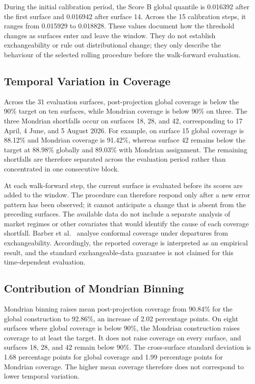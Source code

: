 During the initial calibration period, the Score B global quantile is 0.016392 after the first surface and 0.016942 after surface 14. Across the 15 calibration steps, it ranges from 0.015929 to 0.018828. These values document how the threshold changes as surfaces enter and leave the window. They do not establish exchangeability or rule out distributional change; they only describe the behaviour of the selected rolling procedure before the walk-forward evaluation.

\subsection{Temporal Variation in Coverage}
\label{subsec:disc_regime}

Across the 31 evaluation surfaces, post-projection global coverage is below the 90\% target on ten surfaces, while Mondrian coverage is below 90\% on three. The three Mondrian shortfalls occur on surfaces 18, 28, and 42, corresponding to 17 April, 4 June, and 5 August 2026. For example, on surface 15 global coverage is 88.12\% and Mondrian coverage is 91.42\%, whereas surface 42 remains below the target at 88.98\% globally and 89.03\% with Mondrian assignment. The remaining shortfalls are therefore separated across the evaluation period rather than concentrated in one consecutive block.

At each walk-forward step, the current surface is evaluated before its scores are added to the window. The procedure can therefore respond only after a new error pattern has been observed; it cannot anticipate a change that is absent from the preceding surfaces. The available data do not include a separate analysis of market regimes or other covariates that would identify the cause of each coverage shortfall. Barber et al.\ \cite{barber2023conformal} analyse conformal coverage under departures from exchangeability. Accordingly, the reported coverage is interpreted as an empirical result, and the standard exchangeable-data guarantee is not claimed for this time-dependent evaluation.

\subsection{Contribution of Mondrian Binning}
\label{subsec:disc_mondrian_remedy}

Mondrian binning raises mean post-projection coverage from 90.84\% for the global construction to 92.86\%, an increase of 2.02 percentage points. On eight surfaces where global coverage is below 90\%, the Mondrian construction raises coverage to at least the target. It does not raise coverage on every surface, and surfaces 18, 28, and 42 remain below 90\%. The cross-surface standard deviation is 1.68 percentage points for global coverage and 1.99 percentage points for Mondrian coverage. The higher mean coverage therefore does not correspond to lower temporal variation.


